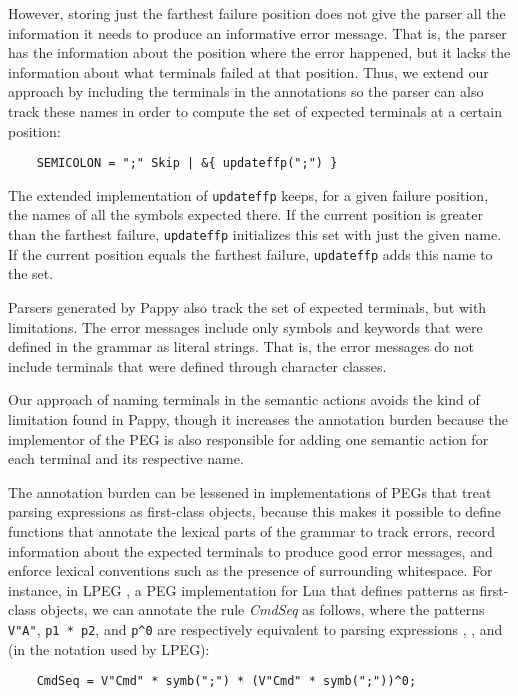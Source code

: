 \documentclass[3p,12pt,singlecolumn]{elsarticle}
\begin{document}
However, storing just the farthest failure position does not give
the parser all the information it needs to produce an informative
error message.
That is, the parser has the information about the position where
the error happened, but it lacks the information about what terminals
failed at that position.
Thus, we extend our approach by including the terminals in the annotations
so the parser can also track these names in order to compute the set of
expected terminals at a certain position:

\begin{verbatim}
    SEMICOLON = ";" Skip | &{ updateffp(";") }
\end{verbatim}

The extended implementation of \texttt{updateffp} keeps,
for a given failure position, the names of all the symbols
expected there.
If the current position is greater than the farthest failure,
{\tt updateffp} initializes this set with just the given name.
If the current position equals the farthest failure, {\tt updateffp}
adds this name to the set.

Parsers generated by Pappy also track the set of expected terminals,
but with limitations.
The error messages include only symbols and keywords that were defined
in the grammar as literal strings.
That is, the error messages do not include terminals that were defined
through character classes.

Our approach of naming terminals in the semantic actions avoids the
kind of limitation found in Pappy, though it increases the annotation
burden because the implementor of the PEG is also responsible for
adding one semantic action for each terminal and its respective name.

The annotation burden can be lessened in implementations of PEGs that
treat parsing expressions as first-class objects, because this makes
it possible to define functions that annotate the lexical parts of the grammar to track errors, record information about the expected
 terminals to produce good error messages, and enforce lexical
  conventions such as the presence of surrounding whitespace.
For instance, in LPEG \cite{lpeg,ierusalimschy2009lpeg}, a PEG
implementation for Lua that defines patterns as first-class objects,
we can annotate the rule \textit{CmdSeq} as follows,
where the patterns \verb'V"A"', \verb'p1 * p2', and \verb'p^0'
are respectively equivalent to parsing expressions
, , and  (in the notation used by LPEG):

\begin{verbatim}
    CmdSeq = V"Cmd" * symb(";") * (V"Cmd" * symb(";"))^0;
\end{verbatim}
\end{document}
